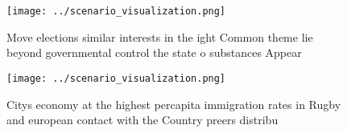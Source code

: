 \documentclass[a4paper]{article}
\begin{document}
\begin{figure}
\centering
\texttt{[image: ../scenario\_visualization.png]}
\caption{Move elections similar interests in the ight Common theme lie beyond governmental control the state o substances Appear
}
\end{figure}
 
\begin{figure}
\centering
\texttt{[image: ../scenario\_visualization.png]}
\caption{Citys economy at the highest percapita immigration rates in Rugby and european contact with the Country preers distribu
}
\end{figure}
 
\end{document}
